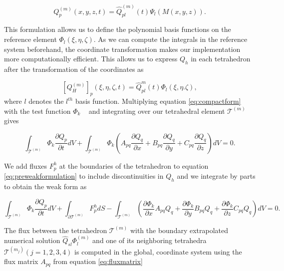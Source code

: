 \begin{equation}
     Q_p^{\left(m\right)}\left(x,y,z,t\right) = \hat{Q}_{pl}^{\left(m\right)}\left(t\right) \Psi_l\left(M\left(x, y, z\right)\right).
\end{equation}

This formulation allows us to define the polynomial basis functions on the reference element $\Phi_l\left(\xi, \eta, \zeta\right)$.
As we can compute the integrals in the reference system beforehand, the coordinate transformation makes our implementation more computationally
efficient. This allows us to express $Q_h$ in each tetrahedron after the transformation of the coordinates
as 

\begin{equation}
    \left[Q_H^{\left(m\right)}\right]_p \left(\xi, \eta, \zeta, t\right) = \hat{Q}_{pl}^m \left(t\right) \Phi_l \left(\xi, \eta. \zeta\right),
\label{eq:solution}
\end{equation}
where $l$ denotes the $l^{th}$ basis function. Multiplying equation \ref{eq:compactform} with the test function $\Phi_k$ ~\parencite{cockburn2011discontinuous}
and integrating over our tetrahedral element $\mathcal{T}^{\left(m\right)}$ gives

\begin{equation}
    \int_{\mathcal{T}^{\left(m\right)}} \Phi_k \frac{\partial Q_p}{\partial t} dV + \int_{\mathcal{T}^{\left(m\right)}} \Phi_k \left(A_{pq} 
    \frac{\partial Q_q}{\partial x} + B_{pq}\frac{\partial Q_q}{\partial y} + C_{pq}\frac{\partial Q_q}{\partial z}\right)dV = 0.
    \label{eq:preweakformulation}
\end{equation}

We add fluxes $F_p^h$ at the boundaries of the tetrahedron to equation \ref{eq:preweakformulation} to include discontinuities in $Q_h$ and we integrate by parts to obtain the weak form as

\begin{equation}
    \int_{\mathcal{T}^{\left(m\right)}} \Phi_k \frac{\partial Q_p}{\partial t} dV + \int_{\partial \mathcal{T}^{\left(m\right)}} F_p^h dS
    - \int_{\mathcal{T}^{\left(m\right)}} \left(\frac{\partial \Phi_k}{\partial x} A_{pq}Q_q + \frac{\partial \Phi_k}{\partial y}B_{pq}Q_q
    + \frac{\partial \Phi_k}{\partial z}C_{pq}Q_q\right) dV = 0.
\label{eq:weakformulation}
\end{equation}

The flux between the tetrahedron $\mathcal{T}^{\left(m\right)}$ with the boundary extrapolated numerical solution $\hat{Q}_{sl} \Phi_l^{\left(m\right)}$
and one of its neighboring tetrahedra $\mathcal{T}^{\left(m_j\right)} \left(j=1,2,3,4\right)$ is computed in the global, coordinate system using the flux
matrix $A_{pq}$ from equation \ref{eq:fluxmatrix}

